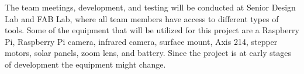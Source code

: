 The team meetings, development, and testing will be conducted at Senior Design Lab and FAB Lab, where all team members have access to different types of tools. Some of the equipment that will be utilized for this project are a Raspberry Pi, Raspberry Pi camera, infrared camera, surface mount, Axis 214, stepper motors, solar panels, zoom lens, and battery. Since the project is at early stages of development the equipment might change.
